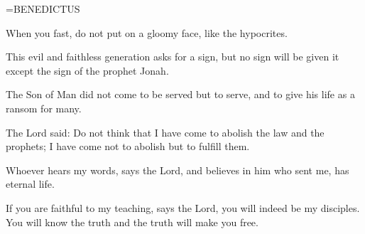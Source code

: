 \hangindent=\parindent \small BENEDICTUS
\begin{description}[labelindent=\parindent, noitemsep, leftmargin=*]
\item [Ash Wednesday:] 	When you fast, do not put on a gloomy face, like the hypocrites.
\item [Week 1:] 	This evil and faithless generation asks for a sign, but no sign will be given it except the sign of the prophet Jonah.
\item [Week 2:] 	The Son of Man did not come to be served but to serve, and to give his life as a ransom for many.
\item [Week 3:] 	The Lord said: Do not think that I have come to abolish the law and the prophets; I have come not to abolish but to fulfill them.
\item [Week 4:] 	Whoever hears my words, says the Lord, and believes in him who sent me, has eternal life.
\item [Week 5:] 	If you are faithful to my teaching, says the Lord, you will indeed be my disciples. You will know the truth and the truth will make you free.
\end{description}

